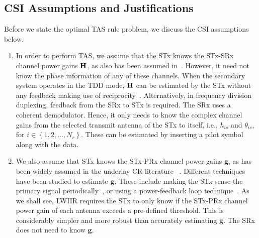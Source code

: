 \documentclass[12pt,draftcls,peerreview,onecolumn]{IEEEtran}
\newcommand{\ie}{{i.e.}}
\newcommand{\mtx}[1]{{\bf #1}} %
\newcommand{\Nr}{{N_r}}
\newcommand{\such}{h}
\newcommand{\puch}{g}
\newcommand{\hk}[1]{{\such_{#1}}}
\newcommand{\g}{\mathbf{\puch}}
\newcommand{\nropts}{\left\{1,2,\ldots,\Nr\right\}}
\newcommand{\suchph}{\theta}
\newcommand{\thetahk}{\suchph_{is}}
\newcommand{\Hmx}{\mtx{H}}
\begin{document}
\subsection{CSI Assumptions and Justifications}  
Before we state the optimal TAS rule problem, we discuss the  CSI assumptions below. 
\begin{enumerate}
\item In order to perform TAS, we assume that the STx knows the STx-SRx channel power gains $\Hmx$, as also has been assumed in~\cite{XKang_2011_JSAC,Hanif_2015_globecom,Sarvendranath_2013_TCOM,Kong_2011_JCN,Wang_2010_TWC,RZhang_2009_TWC}. However, it need not know the phase information of any of these channels. When the secondary system operates in the TDD mode, $\Hmx$ can be estimated by the STx without any feedback making use of reciprocity~\cite{Sarvendranath_2013_TCOM}. Alternatively, in frequency division duplexing, feedback from the SRx to STx is required. The SRx uses a coherent demodulator. Hence, it only needs to know the complex channel gains from the selected transmit antenna of the STx to itself, \ie, $\hk{is}$ and $\thetahk$, for $i\in\nropts$. These can be estimated by inserting a pilot symbol along with the data. 

\item We also assume that STx knows the STx-PRx channel power gains $\g$, as has been widely assumed in the underlay CR literature ~\cite{Hanif_2015_globecom,Sarvendranath_2013_TCOM,Kong_2011_JCN,Wang_2010_TWC,RZhang_2009_TWC}. Different techniques have been studied to estimate  $\g$. These include making the STx sense the primary signal periodically~\cite{Zhang_2017_tcom}, or using a power-feedback loop technique~\cite{RZhang_2008_DSAN}. As we shall see, LWIIR  requires the STx to only know if the STx-PRx channel power gain of each antenna exceeds a pre-defined threshold. This is considerably simpler and more robust than accurately estimating $\g$. The SRx does not need to know $\g$. 


\end{enumerate}
\end{document}
